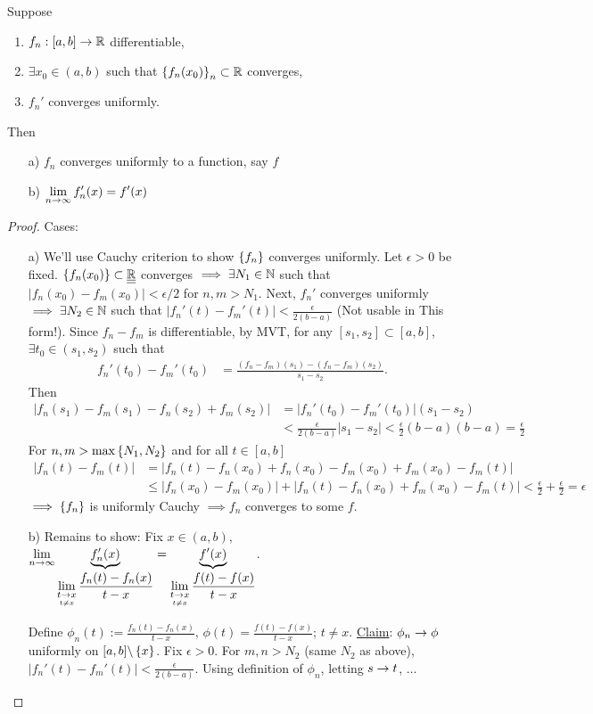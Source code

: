 \documentclass[]{article}
\begin{document}
\begin{theorem}
	\label{thm-7-17}
	Suppose
	\begin{enumerate}
		\item $f_n:[a,b]\ra\mb R$ differentiable,
		\item $\exists x_0\in(a,b)$ such that $\set{f_n(x_0)}_n\subset\mb R$ converges,
		\item $f_n'$ converges uniformly.
	\end{enumerate}
	Then
	\begin{enumerate}
		\item[a)] $f_n$ converges uniformly to a function, say $f$
		\item[b)] $\ds\lim_{n\ra\infty} f_n'(x) = f'(x)$
	\end{enumerate}
\end{theorem}
\begin{proof} Cases:
	\begin{enumerate}
		\item[a)] We'll use Cauchy criterion to show $\set{f_n}$ converges uniformly.
			Let $\epsilon>0$ be fixed. $\set{f_n(x_0)}\subset\ul{\ul{\mb R}}$ converges $\implies \exists N_1\in\mb N$ such that $|f_n(x_0)-f_m(x_0)|<\epsilon/2$ for $n,m>N_1$.
			Next, $f_n'$ converges uniformly $\implies \exists N_2\in\mb N$ such that $|f_n'(t)-f_m'(t)|< \frac\epsilon{2(b-a)}$
			(Not usable in This form!).
			Since $f_n-f_m$ is differentiable, by MVT, for any $[s_1,s_2]\subset[a,b]$, $\exists t_0\in(s_1,s_2)$ such that
			\begin{align*}
				f_n'(t_0)-f_m'(t_0) &= \frac{(f_n-f_m)(s_1)-(f_n-f_m)(s_2)}{s_1-s_2}.
			\end{align*}
			Then
			\begin{align*}
				|f_n(s_1)-f_m(s_1)-f_n(s_2)+f_m(s_2)|
				&= |f_n'(t_0)-f_m'(t_0)|(s_1-s_2) \\
				&< \frac\epsilon{2(b-a)}|s_1-s_2| < \frac\epsilon2{(b-a)}(b-a) = \frac\epsilon2
			\end{align*}
			For $n,m>\max\set{N_1,N_2}$ and for all $t\in[a,b]$
			\begin{align*}
				|f_n(t)-f_m(t)| &= |f_n(t)-f_n(x_0)+f_n(x_0)-f_m(x_0)+f_m(x_0)-f_m(t)| \\
								&\leq |f_n(x_0)-f_m(x_0)|+|f_n(t)-f_n(x_0)+f_m(x_0)-f_m(t)|
								< \frac\epsilon2+\frac\epsilon2=\epsilon
			\end{align*}
			$\implies \set{f_n}$ is uniformly Cauchy $\implies f_n$ converges to some \ul{\ul{$f$}}.
		\item[b)] Remains to show: Fix $x\in(a,b)$,
			$\ds \lim_{n\ra\infty} \ub{\ds\lim_{\us{t\neq x}{t\ra x}} \frac{f_n(t)-f_n(x)}{t-x}}{f_n'(x)} = \ub{\ds\lim_{\us{t\neq x}{t\ra x}} \frac{f(t)-f(x)}{t-x}}{f'(x)} $.
			
			Define $\phi_n(t) := \frac{f_n(t)-f_n(x)}{t-x}$, $\phi(t) = \frac{f(t)-f(x)}{t-x}$; $t\neq x$.
			\ul{Claim}: $\phi_n\ra\phi$ uniformly on $[a,b]\bs\set x$. Fix $\epsilon>0$.
			For $m,n>N_2$ (same $N_2$ as above), $|f_n'(t)-f_m'(t)|<\frac\epsilon{2(b-a)}$.
			Using definition of $\phi_n$, letting $s\ra t$, $\dots$
	\end{enumerate}
\end{proof}
\end{document}
